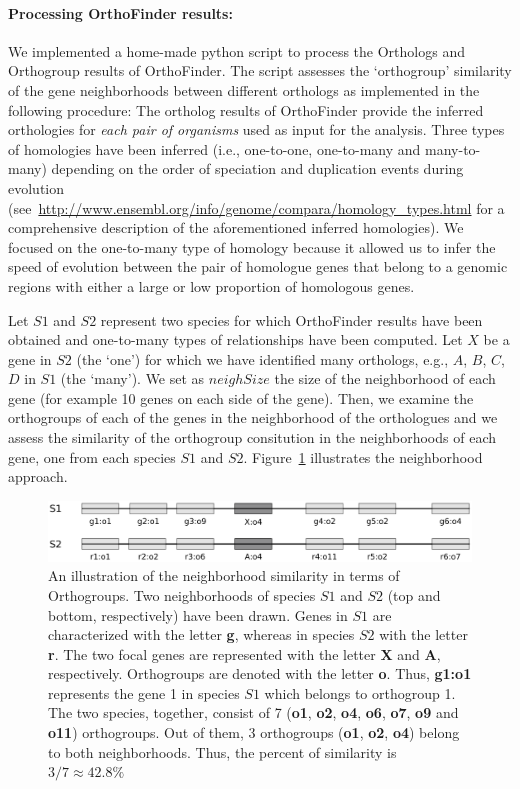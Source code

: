 \documentclass[12pt]{article}
\begin{document}
\paragraph{Processing OrthoFinder results:} We implemented a home-made
python script to process the Orthologs and Orthogroup results of OrthoFinder. The
script assesses the `orthogroup' similarity of the gene neighborhoods
between different orthologs as implemented in the following procedure:
The ortholog results of 
OrthoFinder provide the inferred orthologies for \emph{each pair of
  organisms} used as input for the analysis. Three types of
homologies have been inferred (i.e., one-to-one, one-to-many and
many-to-many) depending on the order of speciation and duplication
events during evolution
(see~\url{http://www.ensembl.org/info/genome/compara/homology_types.html}
for a comprehensive description of the aforementioned inferred
homologies). We focused on the one-to-many type of homology because
  it allowed us to infer the speed of evolution
  between the pair of homologue genes that belong to a genomic
  regions with either a large or low proportion of homologous genes. 

Let $S1$ and $S2$ represent two species for which OrthoFinder results
have been obtained and one-to-many types of relationships have been
computed. Let $X$ be a gene in $S2$ (the `one') for which we have
identified many orthologs, e.g., $A$, $B$, $C$, $D$ in $S1$ (the
`many'). We set as $neighSize$  the size of the neighborhood of each
gene (for example 10 genes on each side of the gene). Then, we examine
the orthogroups of each of the genes in the neighborhood of the
orthologues and we assess the similarity of the orthogroup consitution
in the neighborhoods of each gene, one from each species $S1$ and
$S2$. Figure~\ref{fig:nei} illustrates the neighborhood approach.

\begin{figure}[htbp!]
  \centering
  \includegraphics[width=\textwidth]{neighborhood.pdf}
  \caption{An illustration of the neighborhood similarity in terms of
    Orthogroups. Two neighborhoods of species $S1$ and $S2$ (top and
    bottom, respectively) have been     drawn. Genes in $S1$ are
    characterized with the letter {\bf g}, whereas in species $S2$ with
    the letter {\bf r}. The two focal genes are represented with the
    letter {\bf X} and {\bf A}, respectively. Orthogroups are denoted with the letter {\bf
      o}. Thus, {\bf g1:o1} represents the gene 1 in species $S1$
    which belongs to orthogroup 1. The two species, together, consist
    of 7 ({\bf o1}, {\bf o2}, {\bf o4}, {\bf o6}, {\bf o7}, {\bf o9}
    and {\bf o11})
    orthogroups. Out of them, 3 orthogroups ({\bf o1}, {\bf o2}, {\bf
      o4}) belong to both neighborhoods. Thus, the percent of
    similarity is $3/7 \approx 42.8\%$ }
  \label{fig:nei}
\end{figure}
\end{document}
